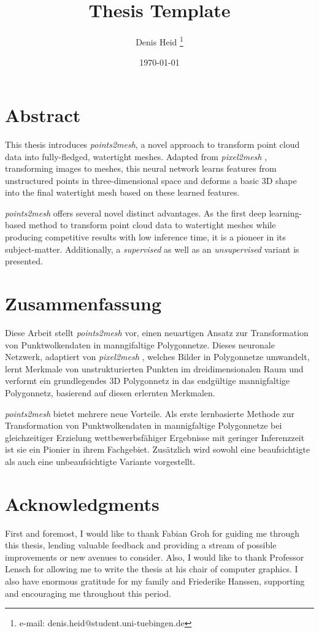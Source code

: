 \documentclass[a4paper,cleardoubleempty,BCOR1cm]{scrbook}
\title{Thesis Template}
\author{Denis Heid \thanks{e-mail: denis.heid@student.uni-tuebingen.de}}
\date{\today}
\begin{document}


\chapter*{Abstract}
    This thesis introduces \emph{points2mesh}, a novel approach to transform point cloud data into fully-fledged, watertight meshes. 
    Adapted from \emph{pixel2mesh} \cite{wang2018pixel2mesh}, transforming images to meshes, this neural network learns features from unstructured points
    in three-dimensional space and deforms a basic 3D shape into the final watertight mesh based on these learned features.

    \emph{points2mesh} offers several novel distinct advantages. As the first deep learning-based method to transform point
    cloud data to watertight meshes while producing competitive results with low inference time, it is a pioneer in its subject-matter.
    Additionally, a \emph{supervised} as well as an \emph{unsupervised} variant is presented.


\chapter*{Zusammenfassung}
    Diese Arbeit stellt \emph{points2mesh} vor, einen neuartigen Ansatz zur Transformation von Punktwolkendaten in manngifaltige Polygonnetze. 
    Dieses neuronale Netzwerk, adaptiert von \emph{pixel2mesh} \cite{wang2018pixel2mesh}, welches Bilder in Polygonnetze umwandelt, lernt Merkmale von unstrukturierten Punkten 
    im dreidimensionalen Raum und verformt ein grundlegendes 3D Polygonnetz in das endgültige mannigfaltige Polygonnetz, basierend auf diesen erlernten Merkmalen.

    \emph{points2mesh} bietet mehrere neue Vorteile. Als erste lernbasierte Methode zur Transformation von Punktwolkendaten in mannigfaltige Polygonnetze
    bei gleichzeitiger Erzielung wettbewerbsfähiger Ergebnisse mit geringer Inferenzzeit ist sie ein Pionier in ihrem Fachgebiet.
    Zusätzlich wird sowohl eine beaufsichtigte als auch eine unbeaufsichtigte Variante vorgestellt.


\chapter*{Acknowledgments}
    First and foremost, I would like to thank Fabian Groh for guiding me through this thesis, lending valuable feedback and providing 
    a stream of possible improvements or new avenues to consider. Also, I would like to thank Professor Lensch for allowing me to write
     the thesis at his chair of computer graphics.
    I also have enormous gratitude for my family and Friederike Hanssen, supporting and encouraging me throughout this period.
\end{document}
